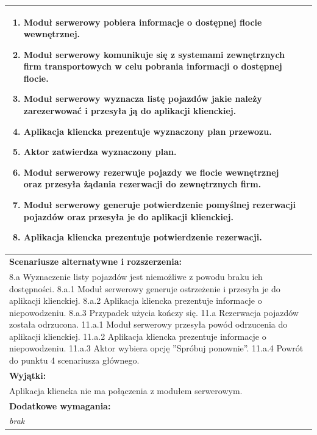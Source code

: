 \begin{center}
\begin{longtable}[h]{|p{1.6cm}|p{13.5cm}|}
{\begin{enumerate}
\item Moduł serwerowy pobiera informacje o dostępnej flocie wewnętrznej.
\item Moduł serwerowy komunikuje się z systemami zewnętrznych firm transportowych w celu pobrania informacji o dostępnej flocie.
\item Moduł serwerowy wyznacza listę pojazdów jakie należy zarezerwować i przesyła ją do aplikacji klienckiej.
\item Aplikacja kliencka prezentuje wyznaczony plan przewozu.
\item Aktor zatwierdza wyznaczony plan.
\item Moduł serwerowy rezerwuje pojazdy we flocie wewnętrznej oraz przesyła żądania rezerwacji do zewnętrznych firm.
\item Moduł serwerowy generuje potwierdzenie pomyślnej rezerwacji pojazdów oraz przesyła je do aplikacji klienckiej.
\item Aplikacja kliencka prezentuje potwierdzenie rezerwacji.
\end{enumerate}
} \\ \hline
\multicolumn{2}{|p{15.1cm}|}{\textbf{Scenariusze alternatywne i rozszerzenia:}} \\
\multicolumn{2}{|p{15.1cm}|}{
8.a Wyznaczenie listy pojazdów jest niemożliwe z powodu braku ich dostępności. \newline
8.a.1 Moduł serwerowy generuje ostrzeżenie i przesyła je do aplikacji klienckiej. \newline
8.a.2 Aplikacja kliencka prezentuje informacje o niepowodzeniu. \newline
8.a.3 Przypadek użycia kończy się.\newline
\newline
11.a Rezerwacja pojazdów została odrzucona. \newline
11.a.1 Moduł serwerowy przesyła powód odrzucenia do aplikacji klienckiej.\newline
11.a.2 Aplikacja kliencka prezentuje informacje o niepowodzeniu. \newline
11.a.3 Aktor wybiera opcję ''Spróbuj ponownie''. \newline
11.a.4 Powrót do punktu 4 scenariusza głównego.
} \\ \hline
\multicolumn{2}{|p{15.1cm}|}{\textbf{Wyjątki:}} \\
\multicolumn{2}{|p{15.1cm}|}{
Aplikacja kliencka nie ma połączenia z modułem serwerowym.
} \\ \hline
\multicolumn{2}{|p{15.1cm}|}{\textbf{Dodatkowe wymagania:}} \\
\multicolumn{2}{|p{15.1cm}|}{
\textit{brak}
} \\
\hline
\end{longtable}
\end{center}

